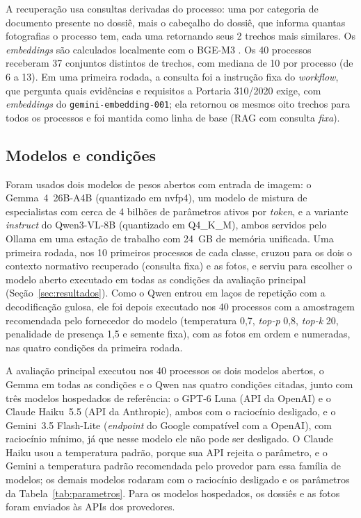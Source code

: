 A recuperação usa consultas derivadas do processo: uma por categoria de documento presente no dossiê, mais o cabeçalho do dossiê, que informa quantas fotografias o processo tem, cada uma retornando seus 2 trechos mais similares. Os \textit{embeddings} são calculados localmente com o BGE-M3 \cite{Chen2024}. Os 40 processos receberam 37 conjuntos distintos de trechos, com mediana de 10 por processo (de 6 a 13). Em uma primeira rodada, a consulta foi a instrução fixa do \textit{workflow}, que pergunta quais evidências e requisitos a Portaria 310/2020 exige, com \textit{embeddings} do \texttt{gemini-embedding-001}; ela retornou os mesmos oito trechos para todos os processos e foi mantida como linha de base (RAG com consulta \textit{fixa}).

\subsection{Modelos e condições}

Foram usados dois modelos de pesos abertos com entrada de imagem: o Gemma~4~26B-A4B (quantizado em nvfp4), um modelo de mistura de especialistas com cerca de 4 bilhões de parâmetros ativos por \textit{token}, e a variante \textit{instruct} do Qwen3-VL-8B (quantizado em Q4\_K\_M), ambos servidos pelo Ollama em uma estação de trabalho com 24~GB de memória unificada. Uma primeira rodada, nos 10 primeiros processos de cada classe, cruzou para os dois o contexto normativo recuperado (consulta fixa) e as fotos, e serviu para escolher o modelo aberto executado em todas as condições da avaliação principal (Seção~\ref{sec:resultados}). Como o Qwen entrou em laços de repetição com a decodificação gulosa, ele foi depois executado nos 40 processos com a amostragem recomendada pelo fornecedor do modelo (temperatura 0,7, \textit{top-p} 0,8, \textit{top-k} 20, penalidade de presença 1,5 e semente fixa), com as fotos em ordem e numeradas, nas quatro condições da primeira rodada.

A avaliação principal executou nos 40 processos os dois modelos abertos, o Gemma em todas as condições e o Qwen nas quatro condições citadas, junto com três modelos hospedados de referência: o GPT-6 Luna (API da OpenAI) e o Claude Haiku~5.5 (API da Anthropic), ambos com o raciocínio desligado, e o Gemini~3.5 Flash-Lite (\textit{endpoint} do Google compatível com a OpenAI), com raciocínio mínimo, já que nesse modelo ele não pode ser desligado. O Claude Haiku usou a temperatura padrão, porque sua API rejeita o parâmetro, e o Gemini a temperatura padrão recomendada pelo provedor para essa família de modelos; os demais modelos rodaram com o raciocínio desligado e os parâmetros da Tabela~\ref{tab:parametros}. Para os modelos hospedados, os dossiês e as fotos foram enviados às APIs dos provedores.

